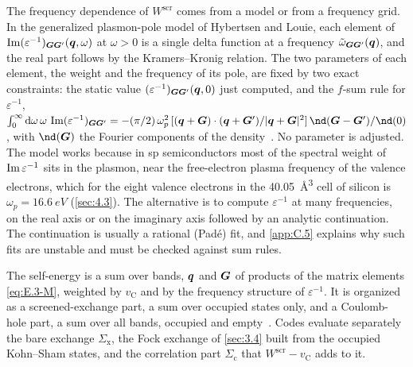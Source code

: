 The frequency dependence of $W^{\mathrm{scr}}$ comes from a model or from a frequency grid. In the generalized plasmon-pole model of Hybertsen and Louie, each element of $\operatorname{Im}(\varepsilon^{-1})_{\bm{G}\bm{G}'}(\bm{q}, \omega)$ at $\omega > 0$ is a single delta function at a frequency $\tilde\omega_{\bm{G}\bm{G}'}(\bm{q})$, and the real part follows by the Kramers--Kronig relation. The two parameters of each element, the weight and the frequency of its pole, are fixed by two exact constraints: the static value $(\varepsilon^{-1})_{\bm{G}\bm{G}'}(\bm{q}, 0)$ just computed, and the $f$-sum rule for $\varepsilon^{-1}$, $\int_0^\infty\dd\omega\,\omega\,\Imag(\varepsilon^{-1})_{\vect{G}\vect{G}'} = -(\pi/2)\,\omega_p^2\,[(\vect{q} + \vect{G})\cdot(\vect{q} + \vect{G}')/|\vect{q} + \vect{G}|^2]\,\nd(\vect{G} - \vect{G}')/\nd(0)$, with $\nd(\vect{G})$ the Fourier components of the density~\cite[Eqs.~(83)--(86)]{aryasetiawan1998gw}. No parameter is adjusted. The model works because in sp semiconductors most of the spectral weight of $\operatorname{Im}\varepsilon^{-1}$ sits in the plasmon, near the free-electron plasma frequency of the valence electrons, which for the eight valence electrons in the \SI{40.05}{\angstrom^3} cell of silicon is $\omega_p = \SI{16.6}{eV}$ (\cref{sec:4.3}). The alternative is to compute $\varepsilon^{-1}$ at many frequencies, on the real axis or on the imaginary axis followed by an analytic continuation. The continuation is usually a rational (Pad\'e) fit, and \cref{app:C.5} explains why such fits are unstable and must be checked against sum rules.

The self-energy is a sum over bands, $\bm{q}$ and $\bm{G}$ of products of the matrix elements \cref{eq:E.3-M}, weighted by $v_{\mathrm{C}}$ and by the frequency structure of $\varepsilon^{-1}$. It is organized as a screened-exchange part, a sum over occupied states only, and a Coulomb-hole part, a sum over all bands, occupied and empty~\cite[Eqs.~(19)--(22)]{deslippe2012berkeleygw}. Codes evaluate separately the bare exchange $\Sigma_{\mathrm{x}}$, the Fock exchange of \cref{sec:3.4} built from the occupied Kohn--Sham states, and the correlation part $\Sigma_{\mathrm{c}}$ that $W^{\mathrm{scr}} - v_{\mathrm{C}}$ adds to it.


